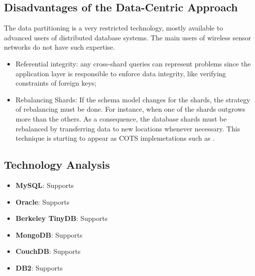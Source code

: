 
\subsection{Disadvantages of the Data-Centric Approach}

The data partitioning is a very restricted technology, mostly available to
advanced users of distributed database systems. The main users of wireless
sensor networks do not have such expertise.

\begin{itemize}
  \item Referential integrity: any cross-shard queries can represent problems 
  since the application layer is responsible to enforce data integrity, like
  verifying constraints of foreign keys;
  \item Rebalancing Shards: If the schema model changes for the shards, the
  strategy of rebalancing must be done. For instance, when one of the shards 
  outgrows more than the others. As a consequence, the database shards must be
  rebalanced by transferring data to new locations whenever necessary. This
  technique is starting to appear as COTS implemetations such as
  \cite{mongodb}.
\end{itemize}

\subsection{Technology Analysis}

\begin{itemize}
  \item \textbf{MySQL}: Supports
  \item \textbf{Oracle}: Supports
  \item \textbf{Berkeley TinyDB}: Supports
  \item \textbf{MongoDB}: Supports
  \item \textbf{CouchDB}: Supports
  \item \textbf{DB2}: Supports
\end{itemize}

